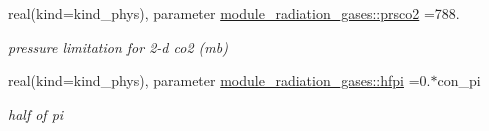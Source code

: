 \begin{Indent}
\begin{DoxyCompactItemize}
real(kind=kind\+\_\+phys), parameter \hyperlink{group__module__radiation__gases_gab09dc05b8a02e9a0b56991508b599708}{module\+\_\+radiation\+\_\+gases\+::prsco2} =788.
\begin{DoxyCompactList}\small\item\em pressure limitation for 2-\/d co2 (mb) \end{DoxyCompactList}\item 
real(kind=kind\+\_\+phys), parameter \hyperlink{group__module__radiation__gases_gab99c75954c59ed92a52de94ca6113f73}{module\+\_\+radiation\+\_\+gases\+::hfpi} =0.$\ast$con\+\_\+pi
\begin{DoxyCompactList}\small\item\em half of pi \end{DoxyCompactList}\end{DoxyCompactItemize}
\end{Indent}

